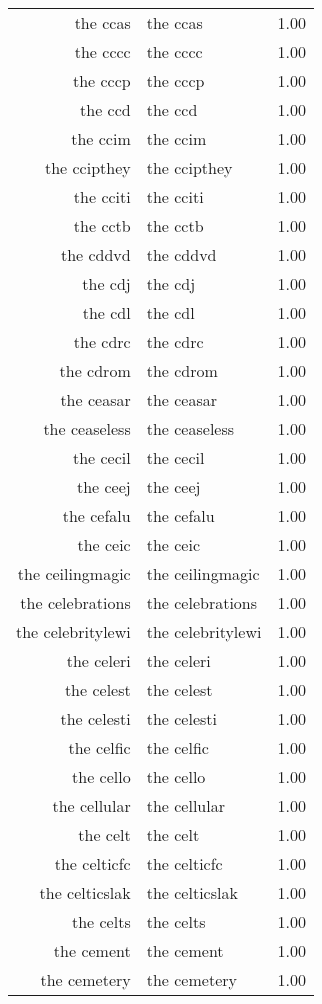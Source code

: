 \begin{table}[ht]
\begin{tabular}{rlr}
  the ccas & the ccas & 1.00 \\ 
  the cccc & the cccc & 1.00 \\ 
  the cccp & the cccp & 1.00 \\ 
  the ccd & the ccd & 1.00 \\ 
  the ccim & the ccim & 1.00 \\ 
  the ccipthey & the ccipthey & 1.00 \\ 
  the cciti & the cciti & 1.00 \\ 
  the cctb & the cctb & 1.00 \\ 
  the cddvd & the cddvd & 1.00 \\ 
  the cdj & the cdj & 1.00 \\ 
  the cdl & the cdl & 1.00 \\ 
  the cdrc & the cdrc & 1.00 \\ 
  the cdrom & the cdrom & 1.00 \\ 
  the ceasar & the ceasar & 1.00 \\ 
  the ceaseless & the ceaseless & 1.00 \\ 
  the cecil & the cecil & 1.00 \\ 
  the ceej & the ceej & 1.00 \\ 
  the cefalu & the cefalu & 1.00 \\ 
  the ceic & the ceic & 1.00 \\ 
  the ceilingmagic & the ceilingmagic & 1.00 \\ 
  the celebrations & the celebrations & 1.00 \\ 
  the celebritylewi & the celebritylewi & 1.00 \\ 
  the celeri & the celeri & 1.00 \\ 
  the celest & the celest & 1.00 \\ 
  the celesti & the celesti & 1.00 \\ 
  the celfic & the celfic & 1.00 \\ 
  the cello & the cello & 1.00 \\ 
  the cellular & the cellular & 1.00 \\ 
  the celt & the celt & 1.00 \\ 
  the celticfc & the celticfc & 1.00 \\ 
  the celticslak & the celticslak & 1.00 \\ 
  the celts & the celts & 1.00 \\ 
  the cement & the cement & 1.00 \\ 
  the cemetery & the cemetery & 1.00 \\ 

\end{tabular}
\end{table}
